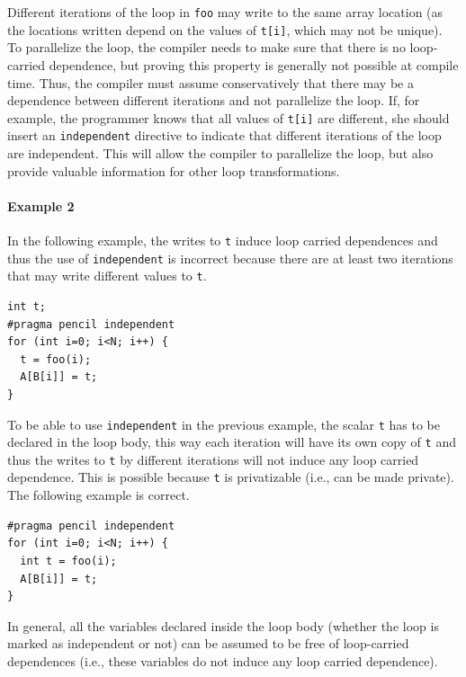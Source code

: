   Different iterations of the loop in \lstinline!foo! may write to the
  same array location (as the locations written depend on the values of
  \lstinline!t[i]!, which may not be unique).
  To parallelize the loop, the compiler
  needs to make sure that there is no loop-carried dependence, but
  proving this property is generally not possible at compile time.  Thus, the
  compiler must assume conservatively that there may be a dependence
  between different iterations and not parallelize the loop.
  If, for example, the \pencil programmer knows that all values of
  \lstinline!t[i]! are different, she
  should insert an \lstinline!independent! directive to indicate that different
  iterations of the loop are independent. This will allow the compiler to
  parallelize the loop, but also provide valuable
  information for other loop transformations.

\paragraph{Example 2}
  In the following example, the writes to \lstinline!t! induce loop carried
  dependences and thus the use of \lstinline!independent! is incorrect because
  there are at least two iterations that may write different values to
  \lstinline!t!.

  \begin{lstlisting}[language=pencil]
int t;
#pragma pencil independent
for (int i=0; i<N; i++) {
  t = foo(i);
  A[B[i]] = t;
}
  \end{lstlisting}  
  
  To be able to use \lstinline!independent! in the previous example, the
  scalar \lstinline!t! has to be declared in the loop body, this way each
  iteration will have its own copy of \lstinline!t! and thus the writes to
  \lstinline!t! by different iterations will not induce any loop carried
  dependence.  This is possible because \lstinline!t! is privatizable (i.e.,
  can be made private).
  The following example is correct.

  \begin{lstlisting}[language=pencil]
#pragma pencil independent
for (int i=0; i<N; i++) {
  int t = foo(i);
  A[B[i]] = t;
}
  \end{lstlisting}
   
  In general, all the variables declared inside the loop body (whether the loop
  is marked as independent or not) can be assumed to be free of loop-carried
  dependences (i.e., these variables do not induce any loop carried dependence).

